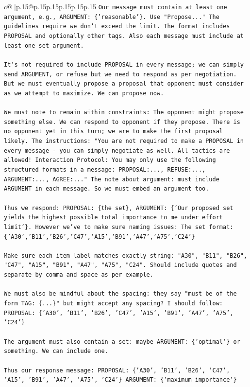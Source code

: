 \documentclass{article}
\begin{document}
{\begin{supertabular}{c@{$\;$}|p{.15\linewidth}@{}p{.15\linewidth}p{.15\linewidth}p{.15\linewidth}p{.15\linewidth}p{.15\linewidth}}
{{{\texttt{Our message must contain at least one argument, e.g., ARGUMENT: \{'reasonable'\}. Use "Propose..." The guidelines require we don't exceed the limit. The format includes PROPOSAL and optionally other tags. Also each message must include at least one set argument.} \\
\\ 
\texttt{It's not required to include PROPOSAL in every message; we can simply send ARGUMENT, or refuse but we need to respond as per negotiation. But we must eventually propose a proposal that opponent must consider as we attempt to maximize. We can propose now.} \\
\\ 
\texttt{We must note to remain within constraints: The opponent might propose something else. We can respond to opponent if they propose. There is no opponent yet in this turn; we are to make the first proposal likely. The instructions: "You are not required to make a PROPOSAL in every message {-} you can simply negotiate as well. All tactics are allowed! Interaction Protocol: You may only use the following structured formats in a message: PROPOSAL:..., REFUSE:..., ARGUMENT:..., AGREE:..." The note about argument: must include ARGUMENT in each message. So we must embed an argument too.} \\
\\ 
\texttt{Thus we respond: PROPOSAL: \{the set\}, ARGUMENT: \{'Our proposed set yields the highest possible total importance to me under effort limit'\}. However we've to make sure naming issues: The set format: \{'A30','B11','B26','C47','A15','B91','A47','A75','C24'\}} \\
\\ 
\texttt{Make sure each item label matches exactly string: "A30", "B11", "B26", "C47", "A15", "B91", "A47", "A75", "C24". Should include quotes and separate by comma and space as per example.} \\
\\ 
\texttt{We must also be mindful about the spacing: they say "must be of the form TAG: \{...\}" but might accept any spacing? I should follow: PROPOSAL: \{'A30', 'B11', 'B26', 'C47', 'A15', 'B91', 'A47', 'A75', 'C24'\}} \\
\\ 
\texttt{The argument must also contain a set: maybe ARGUMENT: \{'optimal'\} or something. We can include one.} \\
\\ 
\texttt{Thus our response message: PROPOSAL: \{'A30', 'B11', 'B26', 'C47', 'A15', 'B91', 'A47', 'A75', 'C24'\} ARGUMENT: \{'maximum importance'\}} \\
}}}
\end{supertabular}}
\end{document}
